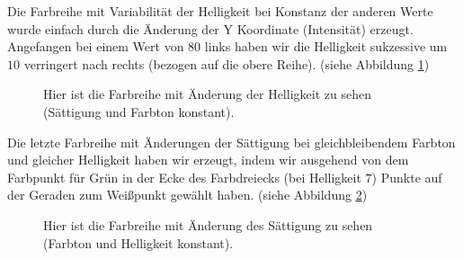 \documentclass[11pt]{article}
\begin{document}
Die Farbreihe mit Variabilität der Helligkeit bei Konstanz der anderen Werte wurde einfach durch die Änderung der Y Koordinate (Intensität) erzeugt. Angefangen bei einem Wert von $80$ links haben wir die Helligkeit sukzessive um $10$ verringert nach rechts (bezogen auf die obere Reihe).  (siehe Abbildung \ref{helligkeit_reihe})
\begin{figure}[H]
\caption{Hier ist die Farbreihe mit Änderung der Helligkeit zu sehen (Sättigung und Farbton konstant).}
\label{helligkeit_reihe}
\end{figure}

Die letzte Farbreihe mit Änderungen der Sättigung bei gleichbleibendem Farbton und gleicher Helligkeit haben wir erzeugt, indem wir ausgehend von dem Farbpunkt für Grün in der Ecke des Farbdreiecks (bei Helligkeit $7$) Punkte auf der Geraden zum Weißpunkt gewählt haben. (siehe Abbildung \ref{saettigung_reihe})
\begin{figure}[H]
\caption{Hier ist die Farbreihe mit Änderung des Sättigung zu sehen (Farbton und Helligkeit konstant).}
\label{saettigung_reihe}
\end{figure}
\end{document}
